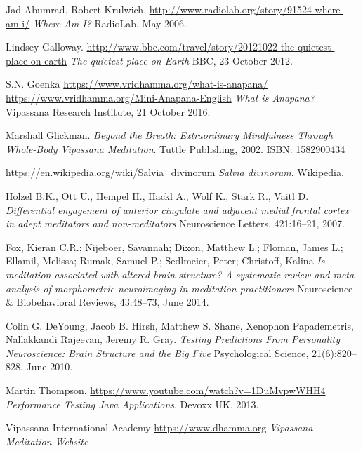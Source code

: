 \documentclass{article}
\begin{document}
\begin{thebibliography}{99}
  Jad Abumrad, Robert Krulwich.
  \url{http://www.radiolab.org/story/91524-where-am-i/}
  \textit{Where Am I?}
  RadioLab, May 2006.

  Lindsey Galloway.
  \url{http://www.bbc.com/travel/story/20121022-the-quietest-place-on-earth}
  \textit{The quietest place on Earth}
  BBC, 23 October 2012.

  S.N. Goenka
  \url{https://www.vridhamma.org/what-is-anapana/}
  \url{https://www.vridhamma.org/Mini-Anapana-English}
  \textit{What is Anapana?}
  Vipassana Research Institute, 21 October 2016.

  Marshall Glickman.
  \textit{Beyond the Breath: Extraordinary Mindfulness Through Whole-Body Vipassana Meditation}.
  Tuttle Publishing, 2002.
  ISBN: 1582900434

  \url{https://en.wikipedia.org/wiki/Salvia_divinorum}
  \textit{Salvia divinorum}.
  Wikipedia.

  Holzel B.K., Ott U., Hempel H., Hackl A., Wolf K., Stark R., Vaitl D.
  \textit{Differential engagement of anterior cingulate and adjacent medial frontal cortex in adept meditators and non-meditators}
  Neuroscience Letters, 421:16–21, 2007.

  Fox, Kieran C.R.; Nijeboer, Savannah; Dixon, Matthew L.; Floman, James L.; Ellamil, Melissa; Rumak, Samuel P.; Sedlmeier, Peter; Christoff, Kalina
  \textit{Is meditation associated with altered brain structure? A systematic review and meta-analysis of morphometric neuroimaging in meditation practitioners}
  Neuroscience \& Biobehavioral Reviews, 43:48–73, June 2014.

  Colin G. DeYoung, Jacob B. Hirsh, Matthew S. Shane, Xenophon Papademetris, Nallakkandi Rajeevan, Jeremy R. Gray.
  \textit{Testing Predictions From Personality Neuroscience: Brain Structure and the Big Five}
  Psychological Science, 21(6):820–828, June 2010.

  Martin Thompson.
  \url{https://www.youtube.com/watch?v=1DuMvpwWHH4}
  \textit{Performance Testing Java Applications}.
  Devoxx UK, 2013.

  Vipassana International Academy
  \url{https://www.dhamma.org}
  \textit{Vipassana Meditation Website}

\end{thebibliography}
\end{document}
